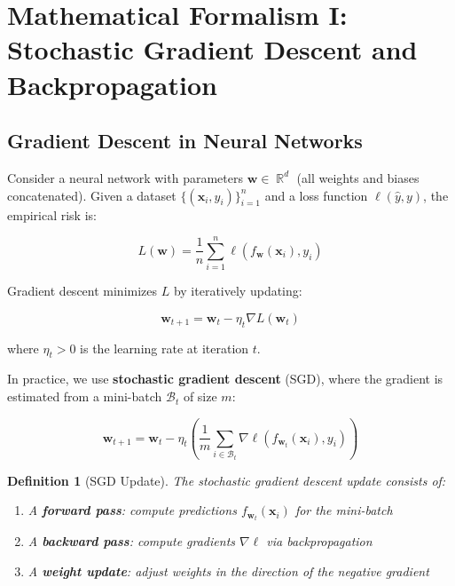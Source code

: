 \documentclass[12pt,letterpaper]{article}
\DeclareMathOperator{\R}{\mathbb{R}}
\newtheorem{definition}[theorem]{Definition}
\begin{document}
\section{Mathematical Formalism I: Stochastic Gradient Descent and Backpropagation}

\subsection{Gradient Descent in Neural Networks}

Consider a neural network with parameters $\mathbf{w} \in \R^d$ (all weights and biases concatenated). Given a dataset $\{(\mathbf{x}_i, y_i)\}_{i=1}^n$ and a loss function $\ell(\hat{y}, y)$, the empirical risk is:

\begin{equation}
L(\mathbf{w}) = \frac{1}{n} \sum_{i=1}^n \ell(f_{\mathbf{w}}(\mathbf{x}_i), y_i) \label{eq:empirical_risk}
\end{equation}

Gradient descent minimizes $L$ by iteratively updating:

\begin{equation}
\mathbf{w}_{t+1} = \mathbf{w}_t - \eta_t \nabla L(\mathbf{w}_t) \label{eq:gd_full}
\end{equation}

where $\eta_t > 0$ is the learning rate at iteration $t$.

In practice, we use \textbf{stochastic gradient descent} (SGD), where the gradient is estimated from a mini-batch $\mathcal{B}_t$ of size $m$:

\begin{equation}
\mathbf{w}_{t+1} = \mathbf{w}_t - \eta_t \left( \frac{1}{m} \sum_{i \in \mathcal{B}_t} \nabla \ell(f_{\mathbf{w}_t}(\mathbf{x}_i), y_i) \right) \label{eq:sgd}
\end{equation}

\begin{definition}[SGD Update]
The stochastic gradient descent update consists of:
\begin{enumerate}
    \item A \textbf{forward pass}: compute predictions $f_{\mathbf{w}_t}(\mathbf{x}_i)$ for the mini-batch
    \item A \textbf{backward pass}: compute gradients $\nabla \ell$ via backpropagation
    \item A \textbf{weight update}: adjust weights in the direction of the negative gradient
\end{enumerate}
\end{definition}
\end{document}

